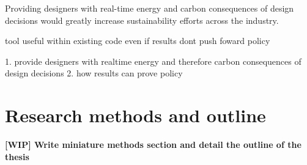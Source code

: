 Providing designers with real-time energy and carbon consequences of design decisions would greatly increase sustainability efforts across the industry. 

tool useful within existing code even if results dont push foward policy
 
1. provide designers with realtime energy and therefore carbon consequences of design decisions
2. how results can prove policy

\section{Research methods and outline}

\textbf{[WIP] Write miniature methods section and detail the outline of the thesis}
